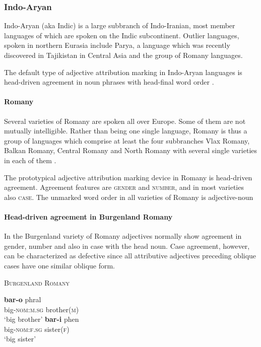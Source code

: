 \subsubsection{Indo-Aryan}
Indo-Aryan (aka Indic) is a large subbranch of Indo-Iranian, most member languages of which are spoken on the Indic subcontinent. Outlier languages, spoken in northern Eurasia include Parya, a language which was recently discovered in Tajikistan in Central Asia \cite[22]{masica1991} and the group of Romany languages. 

The default type of adjective attribution marking in Indo-Aryan languages is head-driven agreement in noun phrases with head-final word order \cite[369]{masica1991}.

\paragraph{Romany}
Several varieties of Romany are spoken all over Europe. Some of them are not mutually intelligible. Rather than being one single language, Romany is thus a group of languages which comprise at least the four subbranches Vlax Romany, Balkan Romany, Central Romany and North Romany with several single varieties in each of them \citep[2–3]{halwachs-etal2002}.

The prototypical adjective attribution marking device in Romany is head-driven agreement. Agreement features are \textsc{gender} and \textsc{number}, and in most varieties also \textsc{case}. The unmarked word order in all varieties of Romany is adjective-noun %

\paragraph{Head-driven agreement in Burgenland Romany}
In the Burgenland variety of Romany adjectives normally show agreement in gender, number and also in case with the head noun. Case agreement, however, can be characterized as defective since all attributive adjectives preceding oblique cases have one similar oblique form.
\begin{exe}
\ex \textsc{Burgenland Romany} \cite[22–23]{halwachs-etal2002}
\begin{xlist} 
\ex 
\gll	\textbf{bar-o} phral\\
	big-\textsc{nom:m.sg} brother(\textsc{m})\\
\glt	‘big brother’
\ex
\gll	\textbf{bar-i} phen\\
	big-\textsc{nom:f.sg} sister(\textsc{f})\\
\glt	‘big sister’
\end{xlist}
\end{exe}

